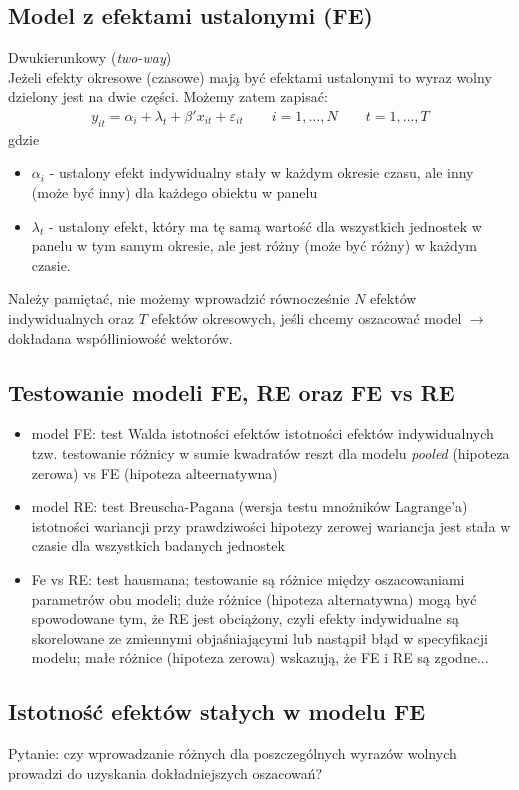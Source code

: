 \subsection{Model z efektami ustalonymi (FE)}
Dwukierunkowy (\emph{two-way})\\
Jeżeli efekty okresowe (czasowe) mają być efektami ustalonymi to wyraz wolny dzielony jest na dwie części. Możemy  zatem zapisać:
\begin{gather*}
y_{it}=\alpha_i+\lambda_t+\beta'x_{it}+\varepsilon_{it}\qquad i=1,\dots,N\qquad t=1,\dots,T
\end{gather*}
gdzie
\begin{itemize}
\item $ \alpha_i $ - ustalony efekt indywidualny stały w każdym okresie czasu, ale inny (może być inny) dla każdego obiektu w panelu
\item $ \lambda_t $ - ustalony efekt, który ma tę samą wartość dla wszystkich jednostek w panelu w tym samym okresie, ale jest różny (może być różny) w każdym czasie.
\end{itemize}
Należy pamiętać, nie możemy wprowadzić równocześnie $ N $ efektów indywidualnych oraz $ T $ efektów okresowych, jeśli chcemy oszacować model $ \rightarrow $ dokładana współliniowość wektorów.
\subsection{Testowanie modeli FE, RE oraz FE vs RE}
\begin{itemize}
\item model FE: test Walda istotności efektów istotności efektów indywidualnych tzw. testowanie różnicy w sumie kwadratów reszt dla modelu \emph{pooled} (hipoteza zerowa) vs FE (hipoteza alteernatywna)
\item model RE: test Breuscha-Pagana (wersja testu mnożników Lagrange'a) istotności wariancji przy prawdziwości hipotezy zerowej wariancja jest stała w czasie dla wszystkich badanych jednostek
\item Fe vs RE: test hausmana; testowanie są różnice między oszacowaniami parametrów obu modeli; duże różnice (hipoteza alternatywna) mogą być spowodowane tym, że RE jest obciążony, czyli efekty indywidualne są skorelowane ze zmiennymi objaśniającymi lub nastąpił błąd w specyfikacji modelu; małe różnice (hipoteza zerowa) wskazują, że FE i RE są zgodne...
\end{itemize}
\subsection{Istotność efektów stałych w modelu FE}
Pytanie: czy wprowadzanie różnych dla poszczególnych wyrazów wolnych prowadzi do uzyskania dokładniejszych oszacowań?
